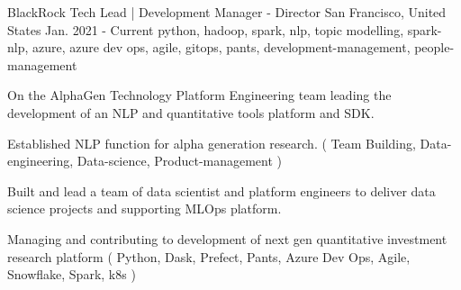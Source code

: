 \cventry
    {BlackRock} %
    {Tech Lead | Development Manager - Director} %
    {San Francisco, United States} %
    {Jan. 2021 - Current} %
    { python, hadoop, spark, nlp, topic modelling, spark-nlp, azure, azure dev ops, agile, gitops, pants, development-management, people-management} %
    {
        On the AlphaGen Technology Platform Engineering team leading the development of an NLP and quantitative tools platform and SDK.
    \begin{cvitems} %
        \item { Established NLP function for alpha generation research. ( Team Building, Data-engineering, Data-science, Product-management ) }
        \item { Built and lead a team of data scientist and platform engineers to deliver data science projects and supporting MLOps platform. }
        \item { Managing and contributing to development of next gen quantitative investment research platform ( Python, Dask, Prefect, Pants, Azure Dev Ops, Agile, Snowflake, Spark, k8s ) }
    \end{cvitems}
    }
